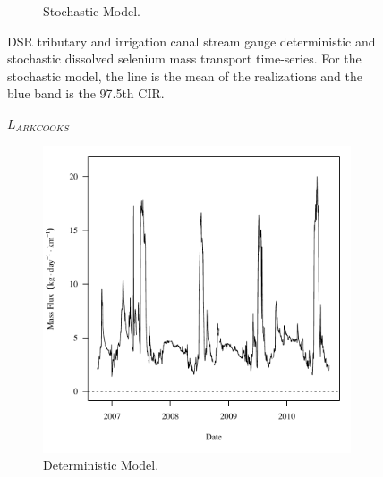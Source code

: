 \begin{linenumbers}
\begin{landscape}
\begin{figure}
\begin{subfigure}{0.7\textwidth}
			\caption{Stochastic Model.}
		\end{subfigure}
		\caption[DSR tributary and irrigation canal stream gauge deterministic and stochastic dissolved selenium mass transport time-series.]{DSR tributary and irrigation canal stream gauge deterministic and stochastic dissolved selenium mass transport time-series.  For the stochastic model, the line is the mean of the realizations and the blue band is the 97.5th CIR.}
		\label{fig:massTrans_DSR}
	\end{figure}
\end{landscape}
\subfiguremid
\begin{landscape}
	\begin{figure}
		$ \displaystyle L_{ARKCOOKS} $
		\begin{subfigure}{0.7\textwidth}
			\centering
			\includegraphics[width=\tableCustomSize]{"Figures/Results_DSR/Deterministic/f D106C"}
			\caption{Deterministic Model.}
		\end{subfigure}%
		\begin{subfigure}{0.7\textwidth}
			\centering

\end{subfigure}
\end{figure}
\end{landscape}
\end{linenumbers}
